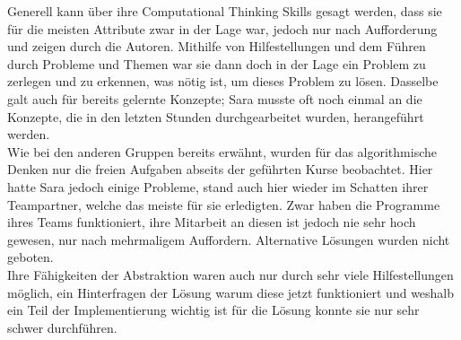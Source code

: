 Generell kann über ihre Computational Thinking Skills gesagt werden, dass sie für die meisten Attribute zwar in der Lage war, jedoch nur nach Aufforderung und zeigen durch die Autoren. Mithilfe von Hilfestellungen und dem Führen durch Probleme und Themen war sie dann doch in der Lage ein Problem zu zerlegen und zu erkennen, was nötig ist, um dieses Problem zu lösen. Dasselbe galt auch für bereits gelernte Konzepte; Sara musste oft noch einmal an die Konzepte, die in den letzten Stunden durchgearbeitet wurden, herangeführt werden.\\
Wie bei den anderen Gruppen bereits erwähnt, wurden für das algorithmische Denken nur die freien Aufgaben abseits der geführten Kurse beobachtet. Hier hatte Sara jedoch einige Probleme, stand auch hier wieder im Schatten ihrer Teampartner, welche das meiste für sie erledigten. Zwar haben die Programme ihres Teams funktioniert, ihre Mitarbeit an diesen ist jedoch nie sehr hoch gewesen, nur nach mehrmaligem Auffordern. Alternative Lösungen wurden nicht geboten.\\
Ihre Fähigkeiten der Abstraktion waren auch nur durch sehr viele Hilfestellungen möglich, ein Hinterfragen der Lösung warum diese jetzt funktioniert und weshalb ein Teil der Implementierung wichtig ist für die Lösung konnte sie nur sehr schwer durchführen.


